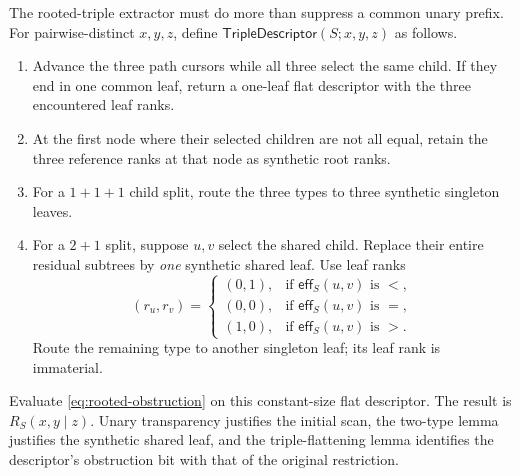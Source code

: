 The rooted-triple extractor must do more than suppress a common unary prefix.
For pairwise-distinct \(x,y,z\), define
\(\mathsf{TripleDescriptor}(S;x,y,z)\) as follows.
\begin{enumerate}
\item Advance the three path cursors while all three select the same child.
      If they end in one common leaf, return a one-leaf flat descriptor with
      the three encountered leaf ranks.
\item At the first node where their selected children are not all equal,
      retain the three reference ranks at that node as synthetic root ranks.
\item For a \(1+1+1\) child split, route the three types to three synthetic
      singleton leaves.
\item For a \(2+1\) split, suppose \(u,v\) select the shared child.  Replace
      their entire residual subtrees by \emph{one} synthetic shared leaf.  Use
      leaf ranks
      \begin{equation}
        (r_u,r_v)=
        \begin{cases}
          (0,1),&\text{if }\mathsf{eff}_S(u,v)\text{ is }<,\\
          (0,0),&\text{if }\mathsf{eff}_S(u,v)\text{ is }=,\\
          (1,0),&\text{if }\mathsf{eff}_S(u,v)\text{ is }>.
        \end{cases}
        \label{eq:synthetic-pair-ranks}
      \end{equation}
      Route the remaining type to another singleton leaf; its leaf rank is
      immaterial.
\end{enumerate}
Evaluate \autoref{eq:rooted-obstruction} on this constant-size flat descriptor.
The result is \(R_S(x,y\mid z)\).  Unary transparency justifies the initial
scan, the two-type lemma justifies the synthetic shared leaf, and the
triple-flattening lemma identifies the descriptor's obstruction bit with that
of the original restriction.

